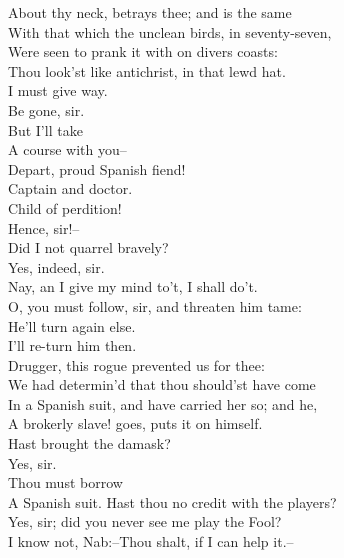 \documentclass{memoir}
\begin{document}
\begin{drama*}
 About thy neck, betrays thee; and is the same\\
 With that which the unclean birds, in seventy-seven,\\
 Were seen to prank it with on divers coasts:\\
 Thou look'st like antichrist, in that lewd hat.\\
\surlyspeaks  I must give way.\\
\kastrilspeaks {} Be gone, sir.\\
\surlyspeaks {} But I'll take\\
 A course with you--\\
\ananiasspeaks {} Depart, proud Spanish fiend!\\
\surlyspeaks  Captain and doctor.\\
\ananiasspeaks {} Child of perdition!\\
\kastrilspeaks  Hence, sir!--\\
 Did I not quarrel bravely?\\
\facespeaks {} Yes, indeed, sir.\\
\kastrilspeaks  Nay, an I give my mind to't, I shall do't.\\
\facespeaks  O, you must follow, sir, and threaten him tame:\\
 He'll turn again else.\\
\kastrilspeaks {} I'll re-turn him then.\\
\facespeaks  Drugger, this rogue prevented us for thee:\\
 We had determin'd that thou should'st have come\\
 In a Spanish suit, and have carried her so; and he,\\
 A brokerly slave! goes, puts it on himself.\\
 Hast brought the damask?\\
\druggerspeaks {} Yes, sir.\\
\facespeaks {} Thou must borrow\\
 A Spanish suit. Hast thou no credit with the players?\\
\druggerspeaks  Yes, sir; did you never see me play the Fool?\\
\facespeaks  I know not, Nab:--Thou shalt, if I can help it.--\\

\end{drama*}
\end{document}
